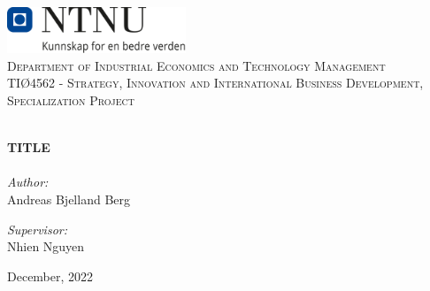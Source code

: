 
\begin{titlepage}
\vbox{ }
\vbox{ }
\begin{center}
\includegraphics[width=0.40\textwidth]{Images/NTNU_logo.png}\\[1cm]
\textsc{\LARGE Department of Industrial Economics and Technology Management}\\[1.5cm]
\textsc{\Large TIØ4562 - Strategy, Innovation and International Business Development, Specialization Project}\\[0.5cm]
\vbox{ }

\HRule \\[0.4cm]
{ \huge \bfseries TITLE}\\[0.4cm]
\HRule \\[1.5cm]

\large
\emph{Author:}\\
Andreas Bjelland Berg

\emph{Supervisor:}\\
Nhien Nguyen
\vfill

{\large December, 2022}
\end{center}
\end{titlepage}